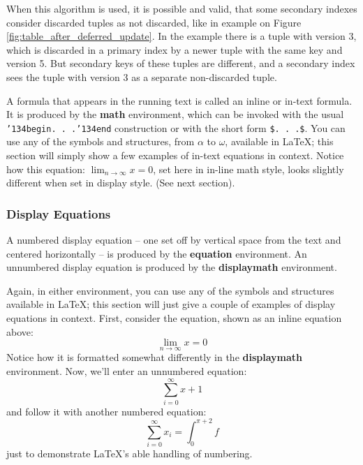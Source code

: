 \documentclass{vldb}
\begin{document}
When this algorithm is used, it is possible and valid, that some secondary
indexes consider discarded tuples as not discarded, like in example on Figure
\ref{fig:table_after_deferred_update}. In the example there is a tuple with
version 3, which is discarded in a primary index by a newer tuple with the same
key and version 5. But secondary keys of these tuples are different, and a
secondary index sees the tuple with version 3 as a separate non-discarded tuple.

A formula that appears in the running text is called an
inline or in-text formula.  It is produced by the
\textbf{math} environment, which can be
invoked with the usual \texttt{{\char'134}begin. . .{\char'134}end}
construction or with the short form \texttt{\$. . .\$}. You
can use any of the symbols and structures,
from $\alpha$ to $\omega$, available in
\LaTeX\cite{Lamport:LaTeX}; this section will simply show a
few examples of in-text equations in context. Notice how
this equation: \begin{math}\lim_{n\rightarrow \infty}x=0\end{math},
set here in in-line math style, looks slightly different when
set in display style.  (See next section).

\subsubsection{Display Equations}
A numbered display equation -- one set off by vertical space
from the text and centered horizontally -- is produced
by the \textbf{equation} environment. An unnumbered display
equation is produced by the \textbf{displaymath} environment.

Again, in either environment, you can use any of the symbols
and structures available in \LaTeX; this section will just
give a couple of examples of display equations in context.
First, consider the equation, shown as an inline equation above:
\begin{equation}\lim_{n\rightarrow \infty}x=0\end{equation}
Notice how it is formatted somewhat differently in
the \textbf{displaymath}
environment.  Now, we'll enter an unnumbered equation:
\begin{displaymath}\sum_{i=0}^{\infty} x + 1\end{displaymath}
and follow it with another numbered equation:
\begin{equation}\sum_{i=0}^{\infty}x_i=\int_{0}^{\pi+2} f\end{equation}
just to demonstrate \LaTeX's able handling of numbering.
\end{document}

